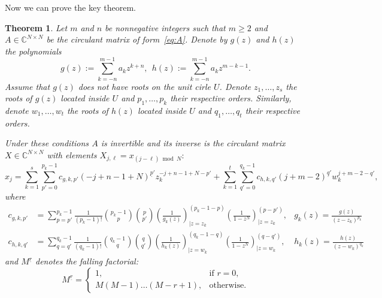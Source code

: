 \documentclass{article}
\newtheorem{theorem}{Theorem}
\begin{document}
	Now we can prove the key theorem.
	\begin{theorem}\label{thm:general-inverse}
	Let $m$ and $n$ be nonnegative integers such that $m \ge 2$ and $A \in \mathbb{C}^{N\times N}$ be the circulant matrix of form~\eqref{eq:A}.
	Denote by $g(z)$ and $h(z)$ the polynomials
	\[
	g(z) := \sum_{k=-n}^{m-1}a_{k}z^{k+n},~~h(z) := \sum_{k=-n}^{m-1}a_{k}z^{m-k-1}.
	\]
	Assume that $g(z)$ does not have roots on the unit cirle $U$.
	Denote $z_1, \dots, z_s$ the roots of $g(z)$ located inside $U$ and $p_1, \dots, p_k$ their respective orders.
	Similarly, denote $w_1, \dots, w_t$ the roots of $h(z)$ located inside $U$ and $q_1, \dots, q_t$ their respective orders.
	
	Under these conditions $A$ is invertible and its inverse is the circulant matrix $X\in\mathbb{C}^{N\times N}$ with elements $X_{j,\ell} = x_{(j-\ell)\bmod N}:$
	\[
	x_j
	=
	\sum_{k=1}^s\sum_{p'=0}^{p_k-1}
	c_{g,k,p'}
	(-j+n-1+N)^{\underline{p}'} z_k^{-j+n-1+N-p'}
	+
	\sum_{k=1}^t\sum_{q'=0}^{q_k-1}
	c_{h,k,q'}
	(j+m-2)^{\underline{q}'}w_k^{j+m-2-q'},
	\]
	where
	\begin{align*}
    c_{g,k,p'}
	    &=
    \sum_{p=p'}^{p_k-1}\frac{1}{(p_k - 1)!}\binom{p_k-1}{p}\binom{p}{p'}
	\left(\frac{1}{g_k(z)}\right)^{(p_k-1-p)}_{\big|{z=z_k}}
	\left(\frac{1}{1-z^{N}}\right)^{(p-p')}_{\big|{z=z_k}},
	&
	g_k(z) = \frac{g(z)}{(z-z_k)^{p_k}}
	\\
	c_{h,k,q'}
	    &=
	\sum_{q=q'}^{q_k-1}
	\frac{1}{(q_k - 1)!}\binom{q_k-1}{q}\binom{q}{q'}
	\left(\frac{1}{h_k(z)}\right)^{(q_k-1-q)}_{\big|{z=w_k}}
	\left(\frac{1}{1-z^{N}}\right)^{(q-q')}_{\big|{z=w_k}},
	&
	h_k(z) = \frac{h(z)}{(z-w_k)^{q_k}}
	\end{align*}
	and
	$M^{\underline{r}}$ denotes the falling factorial:
	\[
	M^{\underline{r}} = 
	\begin{cases}
	1, & \text{if } r = 0, \\
	M(M-1)\dots(M-r+1), & \text{otherwise}.
	\end{cases}
	\]
	\end{theorem}
	
\end{document}
